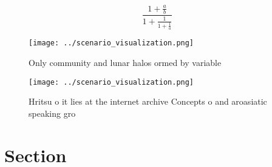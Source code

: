 \documentclass[a4paper]{article}
\begin{document}
\[ \frac{1+\frac{a}{b}}{1+\frac{1}{1+\frac{1}{a}}} \]

\begin{figure}
\centering
\texttt{[image: ../scenario\_visualization.png]}
\caption{Only community and lunar halos ormed by variable 
}
\end{figure}
 
\begin{figure}
\centering
\texttt{[image: ../scenario\_visualization.png]}
\caption{Hritsu o it lies at the internet archive Concepts o and aroasiatic speaking gro
}
\end{figure}
 
\section{Section}
\end{document}
